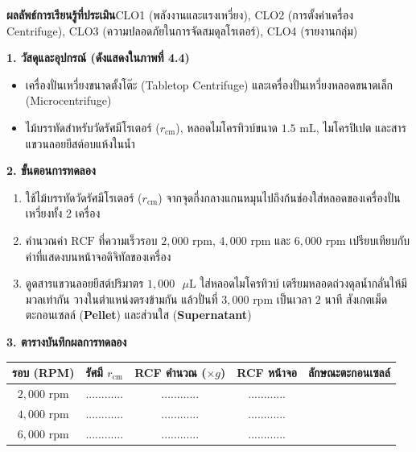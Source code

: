 \begin{labbox}
\noindent\textbf{ผลลัพธ์การเรียนรู้ที่ประเมิน}\quad CLO1 (พลังงานและแรงเหวี่ยง), CLO2 (การตั้งค่าเครื่อง Centrifuge), CLO3 (ความปลอดภัยในการจัดสมดุลโรเตอร์), CLO4 (รายงานกลุ่ม)

\vspace{4pt}
\noindent\textbf{1. วัสดุและอุปกรณ์ (ดังแสดงใน\mbox{ภาพที่} 4.4)}
\begin{itemize}
    \item เครื่องปั่นเหวี่ยงขนาดตั้งโต๊ะ (Tabletop Centrifuge) และเครื่องปั่นเหวี่ยงหลอดขนาดเล็ก (Microcentrifuge)
    \item ไม้บรรทัดสำหรับวัดรัศมีโรเตอร์ ($r_{\text{cm}}$), หลอดไมโครทิวบ์ขนาด $1.5\text{ mL}$, ไมโครปิเปต และสารแขวนลอยยีสต์อบแห้งในน้ำ
\end{itemize}

\noindent\textbf{2. ขั้นตอนการทดลอง}
\begin{enumerate}
    \item ใช้ไม้บรรทัดวัดรัศมีโรเตอร์ ($r_{\text{cm}}$) จากจุดกึ่งกลางแกนหมุนไปถึงก้นช่องใส่หลอดของเครื่องปั่นเหวี่ยงทั้ง 2 เครื่อง
    \item คำนวณค่า $\text{RCF}$ ที่ความเร็วรอบ $2{,}000\text{ rpm}$, $4{,}000\text{ rpm}$ และ $6{,}000\text{ rpm}$ เปรียบเทียบกับค่าที่แสดงบนหน้าจอดิจิทัลของเครื่อง
    \item ดูดสารแขวนลอยยีสต์ปริมาตร $1{,}000\text{ }\mu\text{L}$ ใส่หลอดไมโครทิวบ์ เตรียมหลอดถ่วงดุลน้ำกลั่นให้มีมวลเท่ากัน วางในตำแหน่งตรงข้ามกัน แล้วปั่นที่ $3{,}000\text{ rpm}$ เป็นเวลา $2$ นาที สังเกตเม็ดตะกอนเซลล์ (\textbf{Pellet}) และส่วนใส (\textbf{Supernatant})
\end{enumerate}

\noindent\textbf{3. ตารางบันทึกผลการทดลอง}
\begin{center}
\footnotesize\setlength{\tabcolsep}{3.5pt}
\begin{tabularx}{\linewidth}{c c c c >{\raggedright\arraybackslash}X}
\toprule
\textbf{รอบ (RPM)} & \textbf{รัศมี $r_{\text{cm}}$} & \textbf{RCF คำนวณ ($\times g$)} & \textbf{RCF หน้าจอ} & \textbf{ลักษณะตะกอนเซลล์} \\
\midrule
$2{,}000\text{ rpm}$ & ............ & ............ & ............ & \dotfill \\
$4{,}000\text{ rpm}$ & ............ & ............ & ............ & \dotfill \\
$6{,}000\text{ rpm}$ & ............ & ............ & ............ & \dotfill \\
\bottomrule
\end{tabularx}
\end{center}
\end{labbox}

